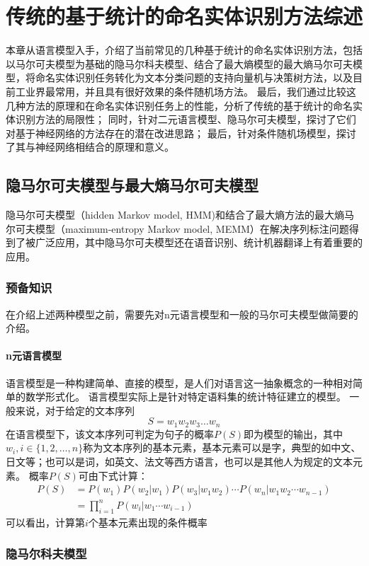\chapter{传统的基于统计的命名实体识别方法综述}
本章从语言模型入手，介绍了当前常见的几种基于统计的命名实体识别方法，包括以马尔可夫模型为基础的隐马尔科夫模型、结合了最大熵模型的最大熵马尔可夫模型，将命名实体识别任务转化为文本分类问题的支持向量机与决策树方法，以及目前工业界最常用，并且具有很好效果的条件随机场方法。
最后，我们通过比较这几种方法的原理和在命名实体识别任务上的性能，分析了传统的基于统计的命名实体识别方法的局限性；
同时，针对二元语言模型、隐马尔可夫模型，探讨了它们对基于神经网络的方法存在的潜在改进思路；
最后，针对条件随机场模型，探讨了其与神经网络相结合的原理和意义。
\section{隐马尔可夫模型与最大熵马尔可夫模型}
隐马尔可夫模型（hidden Markov model, HMM)和结合了最大熵方法的最大熵马尔可夫模型（maximum-entropy Markov model, MEMM）在解决序列标注问题得到了被广泛应用，其中隐马尔可夫模型还在语音识别、统计机器翻译上有着重要的应用。
\subsection{预备知识}
在介绍上述两种模型之前，需要先对n元语言模型和一般的马尔可夫模型做简要的介绍。
\subsubsection{n元语言模型}
语言模型是一种构建简单、直接的模型，是人们对语言这一抽象概念的一种相对简单的数学形式化。
语言模型实际上是针对特定语料集的统计特征建立的模型。
一般来说，对于给定的文本序列
\begin{equation}
    S = w_1 w_2 w_3 \dots w_n
\end{equation}
在语言模型下，该文本序列可判定为句子的概率$P(S)$即为模型的输出，其中$w_i, i\in \{1,2,\dots,n\}$称为文本序列的基本元素，基本元素可以是字，典型的如中文、日文等；也可以是词，如英文、法文等西方语言，也可以是其他人为规定的文本元素。
概率$P(S)$可由下式计算：
\begin{align}
    \label{eq: language model} P(S) &= P(w_1)P(w_2 | w_1)P(w_3 | w_1 w_2)\cdots P(w_n | w_1 w_2 \cdots w_{n-1})\\
    &= \prod_{i=1}^{n}P(w_i | w_1 \cdots w_{i-1})
\end{align}
可以看出，计算第$i$个基本元素出现的条件概率
\subsection{隐马尔科夫模型}
